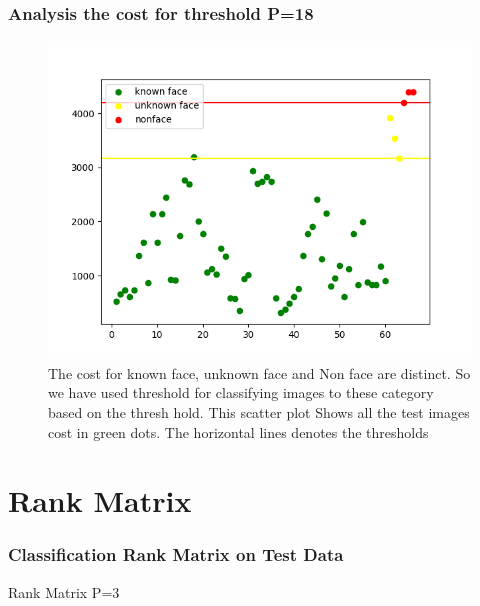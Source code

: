 \documentclass[11pt]{beamer}
\begin{document}
\begin{frame}
\frametitle{Analysis the cost for threshold P=18}
\begin{figure}
\includegraphics[width=.7\textwidth]{thresholds.png}
\caption{The cost for known face, unknown face and Non face are distinct. 
So we have used threshold for classifying images to these category based on the thresh hold. 
This scatter plot Shows all the test images cost in green dots. The horizontal lines denotes the thresholds}
\end{figure}
\end{frame}


\section{Rank Matrix}

\begin{frame}
\frametitle{Classification Rank Matrix on Test Data}
\begin{table}
  \caption{Rank Matrix P=3}
\end{table}
\end{frame}
\end{document}
